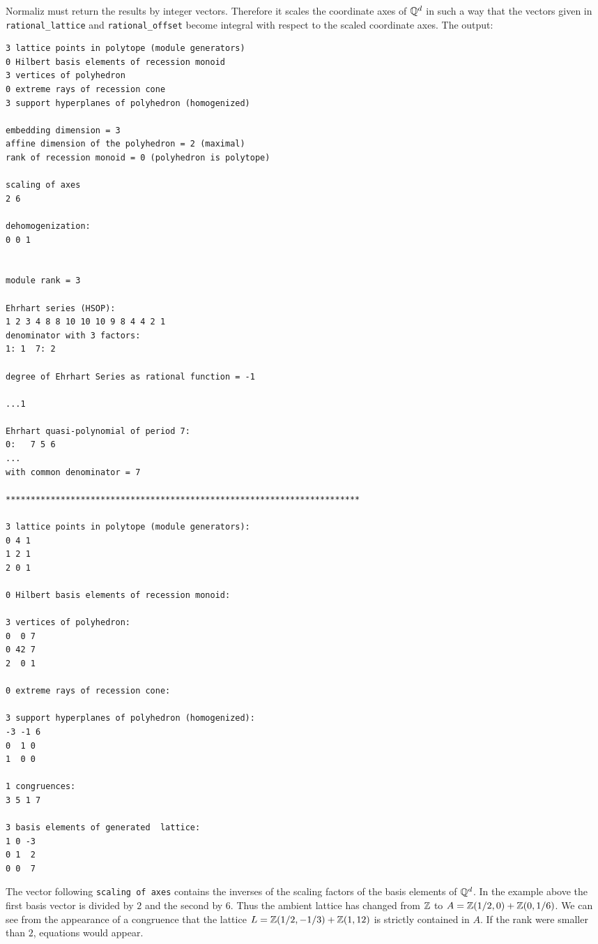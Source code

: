 Normaliz must return the results by integer vectors. Therefore it scales the coordinate axes of ${\mathbb Q}^d$ in such a way that the vectors given in \verb|rational_lattice| and \verb|rational_offset| become integral with respect to the scaled coordinate axes.
The output:
\begin{Verbatim}
3 lattice points in polytope (module generators)
0 Hilbert basis elements of recession monoid
3 vertices of polyhedron
0 extreme rays of recession cone
3 support hyperplanes of polyhedron (homogenized)

embedding dimension = 3
affine dimension of the polyhedron = 2 (maximal)
rank of recession monoid = 0 (polyhedron is polytope)

scaling of axes
2 6 

dehomogenization:
0 0 1 


module rank = 3

Ehrhart series (HSOP):
1 2 3 4 8 8 10 10 10 9 8 4 4 2 1 
denominator with 3 factors:
1: 1  7: 2  

degree of Ehrhart Series as rational function = -1

...1  

Ehrhart quasi-polynomial of period 7:
0:   7 5 6
...
with common denominator = 7

***********************************************************************

3 lattice points in polytope (module generators):
0 4 1
1 2 1
2 0 1

0 Hilbert basis elements of recession monoid:

3 vertices of polyhedron:
0  0 7
0 42 7
2  0 1

0 extreme rays of recession cone:

3 support hyperplanes of polyhedron (homogenized):
-3 -1 6
0  1 0
1  0 0

1 congruences:
3 5 1 7

3 basis elements of generated  lattice:
1 0 -3
0 1  2
0 0  7
\end{Verbatim}

The vector following \verb|scaling of axes| contains the inverses of the scaling factors of the basis elements of ${\mathbb Q}^d$. In the example above the first basis vector is divided by $2$ and the second by $6$. Thus the ambient lattice has changed from ${\mathbb Z}$ to $A={\mathbb Z}(1/2,0)+{\mathbb Z}(0,1/6)$. We can see from the appearance of a congruence that the lattice $L={\mathbb Z}(1/2,-1/3) +{\mathbb Z}(1,12)$ is strictly contained in $A$. If the rank were smaller than $2$, equations would appear.

